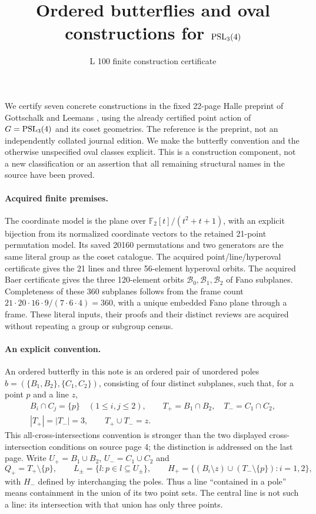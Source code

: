 \documentclass[11pt]{article}
\title{Ordered butterflies and oval constructions for $\operatorname{PSL}_3(4)$}
\author{L 100 finite construction certificate}\date{}
\newcommand{\orb}{\mathcal B}\newcommand{\hyp}{\mathcal H}
\begin{document}
\maketitle
We certify seven concrete constructions in the fixed 22-page Halle preprint
of Gottschalk and Leemans \cite{GL}, using the already certified point action
of $G=\operatorname{PSL}_3(4)$ and its coset geometries. The reference is the preprint,
not an independently collated journal edition. We make the butterfly
convention and the otherwise unspecified oval classes explicit. This is
a construction component, not a new classification or an assertion that
all remaining structural names in the source have been proved.

\paragraph{Acquired finite premises.}
The coordinate model is the plane over
$\mathbb F_2[t]/(t^2+t+1)$, with an explicit bijection from its normalized
coordinate vectors to the retained 21-point permutation model. Its saved
20160 permutations and two generators are the same literal group as the
coset catalogue. The acquired point/line/hyperoval certificate gives the
21 lines and three 56-element hyperoval orbits. The acquired Baer certificate
gives the three 120-element orbits $\orb_0,\orb_1,\orb_2$ of Fano subplanes.
Completeness of these 360 subplanes follows from the frame count
$21\cdot 20\cdot 16\cdot 9/(7\cdot 6\cdot 4)=360$, with a unique embedded
Fano plane through a frame. These literal inputs, their proofs and their
distinct reviews are acquired without repeating a group or subgroup census.

\paragraph{An explicit convention.}
An ordered butterfly in this note is an ordered pair of unordered poles
$b=(\{B_1,B_2\},\{C_1,C_2\})$, consisting of four distinct subplanes,
such that, for a point $p$ and a line $z$,
\[
 \begin{gathered}
 B_i\cap C_j=\{p\}\quad(1\leq i,j\leq 2),\qquad
 T_+=B_1\cap B_2,\quad T_-=C_1\cap C_2,\\
 |T_+|=|T_-|=3,\qquad T_+\cup T_-=z.
 \end{gathered}                                           \tag{1}
\]
This all-cross-intersections convention is stronger than the two displayed
cross-intersection conditions on source page 4; the distinction is addressed
on the last page. Write $U_+=B_1\cup B_2$, $U_-=C_1\cup C_2$ and
\[
 Q_+=T_+\setminus\{p\},\qquad
 L_\pm=\{l:p\in l\subseteq U_\pm\},\qquad
 H_+=\{(B_i\setminus z)\cup(T_-\setminus\{p\}):i=1,2\},
\]
with $H_-$ defined by interchanging the poles. Thus a line ``contained in
a pole'' means containment in the union of its two point sets. The central
line is not such a line: its intersection with that union has only three points.
\end{document}
